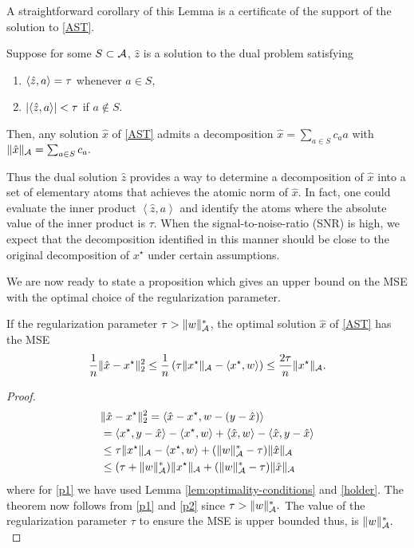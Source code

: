 A straightforward corollary of this Lemma is a certificate of the support of the
solution to \eqref{AST}.

\begin{corollary}
\label{cor:dual-cert-support}

Suppose for some $S \subset \mathcal{A}$,  $\hat{z}$ is a solution to the dual problem  satisfying
\begin{enumerate}
\item $\langle\hat{z}, a\rangle = \tau$ whenever $a \in S,$
\item $|\langle\hat{z}, a\rangle| < \tau$ if $a \not\in S.$
\end{enumerate}
Then, any solution $\hat{x}$ of \eqref{AST} admits a decomposition $\hat{x} =
\sum_{a \in S}{c_a a}$ with $\lVert\hat{x}\rVert_{\mathcal{A}} = \sum_{a \in S}{c_a}.$

\end{corollary}

Thus the dual solution $\hat{z}$ provides a way to determine a decomposition of
$\hat{x}$ into a set of elementary atoms that achieves the atomic norm of
$\hat{x}$. In fact, one could evaluate the inner product $\left<\hat{z},
a\right>$ and identify the atoms where the absolute value of the inner product
is $\tau$. When the signal-to-noise-ratio (SNR) is high, we expect that the
decomposition identified in this manner should be close to the original
decomposition of $x^\star$ under certain assumptions.


We are now ready to state a proposition which gives an upper bound on the MSE
with the optimal choice of the regularization parameter.

\begin{prop}
\label{prop:main-result}

If the regularization parameter $\tau > \lVert w\rVert_{\mathcal{A}}^*$, the optimal solution
$\hat{x}$ of \eqref{AST} has the MSE
\begin{equation}\label{eq:slow-mse}
\frac{1}{n}\lVert\hat{x} - x^\star\rVert_2^2 \leq \frac{1}{n}\left(\tau \lVert x^\star\rVert_{\mathcal{A}} - \langle x^\star, w\rangle\right) \leq \frac{2\tau}{n}\lVert x^\star\rVert_{\mathcal{A}}.
\end{equation} 
\begin{proof}
\begin{align}
	&\lVert\hat{x} - x^\star\rVert_2^2 = \langle\hat{x}-x^\star, w-(y -\hat{x})\rangle         \label{expand}\\
	& = \langle x^\star, y-\hat{x}\rangle - \langle x^\star, w\rangle +\langle\hat{x}, w\rangle -\langle\hat{x}, y-\hat{x}\rangle\nonumber\\
	& \leq \tau\lVert x^\star\rVert_{\mathcal{A}} - \langle x^\star, w\rangle+ (\lVert w\rVert_{\mathcal{A}}^* -  \tau)\lVert\hat{x}\rVert_{\mathcal{A}}\label{p1}\\
	& \leq (\tau + \lVert w\rVert_{\mathcal{A}}^*)\lVert x^\star\rVert_{\mathcal{A}} + (\lVert w\rVert_{\mathcal{A}}^* - \tau)\lVert\hat{x}\rVert_{\mathcal{A}}\label{p2}
\end{align}
where for  \eqref{p1} we have used Lemma \ref{lem:optimality-conditions} and \eqref{holder}. 
The theorem now follows from \eqref{p1} and \eqref{p2} since $\tau
> \lVert w\rVert_{\mathcal{A}}^*.$ The value of the regularization parameter $\tau$ to ensure
the MSE is upper bounded thus, is $\lVert w\rVert_{\mathcal{A}}^*.$
\end{proof}
\end{prop}

